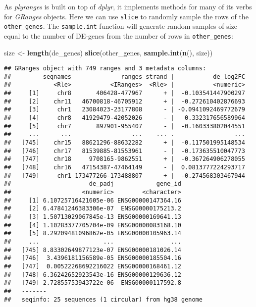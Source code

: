 \documentclass[
]{article}
\newenvironment{Shaded}{}{}
\newcommand{\KeywordTok}[1]{\textcolor[rgb]{0.00,0.44,0.13}{\textbf{#1}}}
\newcommand{\NormalTok}[1]{#1}
\newcommand{\StringTok}[1]{\textcolor[rgb]{0.25,0.44,0.63}{#1}}
\begin{document}
As \emph{plyranges} is built on top of \emph{dplyr}, it implements methods for many of
its verbs for \emph{GRanges} objects. Here we can use \texttt{slice} to randomly sample the
rows of the \texttt{other\_genes}. The \texttt{sample.int} function will generate random
samples of size equal to the number of DE-genes from the number of rows in
\texttt{other\_genes}:

\begin{Shaded}
\begin{Highlighting}[]
\NormalTok{size <-}\StringTok{ }\KeywordTok{length}\NormalTok{(de_genes)}
\KeywordTok{slice}\NormalTok{(other_genes, }\KeywordTok{sample.int}\NormalTok{(}\KeywordTok{n}\NormalTok{(), size))}
\end{Highlighting}
\end{Shaded}

\begin{verbatim}
## GRanges object with 749 ranges and 3 metadata columns:
##         seqnames              ranges strand |           de_log2FC
##            <Rle>           <IRanges>  <Rle> |           <numeric>
##     [1]     chr8       406428-477967      + |  -0.103541447900297
##     [2]    chr11   46700818-46705912      + |  -0.272610402876693
##     [3]     chr1   23084023-23177808      - | -0.0941092469772679
##     [4]     chr8   41929479-42052026      - |   0.332317656589964
##     [5]     chr7       897901-955407      - |  -0.160333802044551
##     ...      ...                 ...    ... .                 ...
##   [745]    chr15   88621296-88632282      + |  -0.117501995148534
##   [746]    chr17   81539885-81553961      - |  -0.173635510047773
##   [747]    chr18     9708165-9862551      + |  -0.367264906278055
##   [748]    chr16   47154387-47464149      - |  0.0813777224293717
##   [749]     chr1 173477266-173488807      + |  -0.274568303467944
##                      de_padj            gene_id
##                    <numeric>        <character>
##     [1] 6.10725716421605e-06 ENSG00000147364.16
##     [2] 6.47841246383306e-07  ENSG00000175213.2
##     [3] 1.50713029067845e-13 ENSG00000169641.13
##     [4] 1.10283377705704e-09 ENSG00000083168.10
##     [5] 8.29209481096862e-05 ENSG00000105963.14
##     ...                  ...                ...
##   [745] 8.83302649877123e-07 ENSG00000181026.14
##   [746]  3.4396181156589e-05 ENSG00000185504.16
##   [747]  0.00522268692216022 ENSG00000168461.12
##   [748] 6.36242652923543e-16 ENSG00000129636.12
##   [749] 2.72855753943722e-06  ENSG00000117592.8
##   -------
##   seqinfo: 25 sequences (1 circular) from hg38 genome
\end{verbatim}
\end{document}
